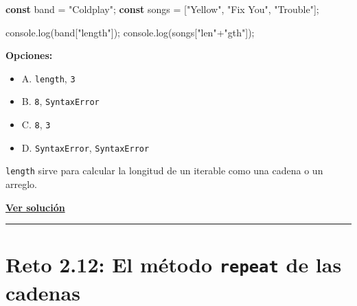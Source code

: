 \documentclass[
  letterpaper,
  DIV=11,
  numbers=noendperiod]{scrreprt}
\newenvironment{Shaded}{\begin{snugshade}}{\end{snugshade}}
\newcommand{\BuiltInTok}[1]{\textcolor[rgb]{0.00,0.23,0.31}{#1}}
\newcommand{\FunctionTok}[1]{\textcolor[rgb]{0.28,0.35,0.67}{#1}}
\newcommand{\KeywordTok}[1]{\textcolor[rgb]{0.00,0.23,0.31}{\textbf{#1}}}
\newcommand{\NormalTok}[1]{\textcolor[rgb]{0.00,0.23,0.31}{#1}}
\newcommand{\OperatorTok}[1]{\textcolor[rgb]{0.37,0.37,0.37}{#1}}
\newcommand{\StringTok}[1]{\textcolor[rgb]{0.13,0.47,0.30}{#1}}
\providecommand{\tightlist}{%
  \setlength{\itemsep}{0pt}\setlength{\parskip}{0pt}}
\begin{document}
\begin{Shaded}
\begin{Highlighting}[]
\KeywordTok{const}\NormalTok{ band }\OperatorTok{=} \StringTok{"Coldplay"}\OperatorTok{;}
\KeywordTok{const}\NormalTok{ songs }\OperatorTok{=}\NormalTok{ [}\StringTok{"Yellow"}\OperatorTok{,} \StringTok{"Fix You"}\OperatorTok{,} \StringTok{"Trouble"}\NormalTok{]}\OperatorTok{;}

\BuiltInTok{console}\OperatorTok{.}\FunctionTok{log}\NormalTok{(band[}\StringTok{"length"}\NormalTok{])}\OperatorTok{;}
\BuiltInTok{console}\OperatorTok{.}\FunctionTok{log}\NormalTok{(songs[}\StringTok{"len"}\OperatorTok{+}\StringTok{"gth"}\NormalTok{])}\OperatorTok{;}
\end{Highlighting}
\end{Shaded}

\textbf{Opciones:}

\begin{itemize}
\tightlist
\item
  A. \texttt{length}, \texttt{3}
\item
  B. \texttt{8}, \texttt{SyntaxError}
\item
  C. \texttt{8}, \texttt{3}
\item
  D. \texttt{SyntaxError}, \texttt{SyntaxError}
\end{itemize}

\begin{tcolorbox}[enhanced jigsaw, left=2mm, toprule=.15mm, leftrule=.75mm, breakable, colback=white, coltitle=black, bottomtitle=1mm, arc=.35mm, rightrule=.15mm, colframe=quarto-callout-tip-color-frame, opacitybacktitle=0.6, toptitle=1mm, opacityback=0, titlerule=0mm, title=\textcolor{quarto-callout-tip-color}{\faLightbulb}\hspace{0.5em}{Pista}, bottomrule=.15mm, colbacktitle=quarto-callout-tip-color!10!white]

\texttt{length} sirve para calcular la longitud de un iterable como una
cadena o un arreglo.

\end{tcolorbox}

\textbf{\hyperref[sec-sol-cap2-reto11]{Ver solución}}

\begin{center}\rule{0.5\linewidth}{0.5pt}\end{center}

\section{\texorpdfstring{Reto 2.12: El método \texttt{repeat} de las
cadenas}{Reto 2.12: El método repeat de las cadenas}}\label{sec-cap2-reto12}
\end{document}
